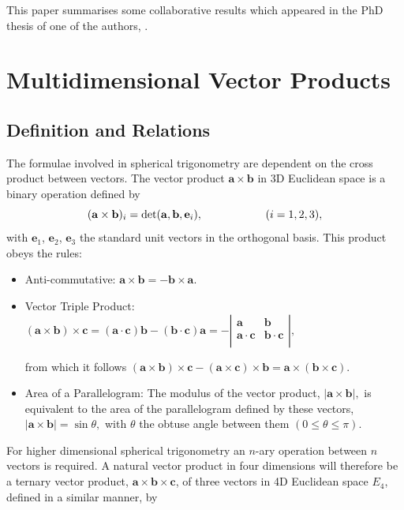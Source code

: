 \documentclass[fleqn,11pt,twoside]{article}
\theoremstyle{definition}
\begin{document}
 This paper summarises some collaborative results which 
appeared in the PhD thesis of one of the authors, \cite{Jennings-thesis}. 


\section{Multidimensional Vector Products}
\label{sec:multidim products}

\subsection{Definition and Relations}
The formulae involved in spherical trigonometry are dependent on the cross product between vectors. The vector product $\mathbf{a}\times\mathbf{b}$ in 3D Euclidean space is a binary operation defined by
\begin{equation}
(\mathbf{a}\times\mathbf{b})_i=\mathrm{det}(\mathbf{a},\mathbf{b},\mathbf{e}_i),\hspace{20mm}(i=1,2,3),
\end{equation}
with  $\mathbf{e}_1$, $\mathbf{e}_2$, $\mathbf{e}_3$ the standard unit vectors in the orthogonal basis. This product obeys the rules:
\begin{itemize}
	\item Anti-commutative: $\mathbf{a}\times\mathbf{b}=-\mathbf{b}\times\mathbf{a}.$
	\item Vector Triple Product: $(\mathbf{a}\times\mathbf{b})\times\mathbf{c}=(\mathbf{a}\cdot\mathbf{c})\mathbf{b}-(\mathbf{b}\cdot\mathbf{c})\mathbf{a}=-\left|
	\begin{array}{cc}
	\mathbf{a} & \mathbf{b} \\
	\mathbf{a}\cdot\mathbf{c} & \mathbf{b}\cdot\mathbf{c}\\	
	\end{array}\right|,$
	
	from which it follows
	$(\mathbf{a}\times\mathbf{b})\times\mathbf{c}-(\mathbf{a}\times\mathbf{c})\times\mathbf{b}=\mathbf{a}\times(\mathbf{b}\times\mathbf{c}).$
	\item Area of a Parallelogram: The modulus of the vector product, $|\mathbf{a}\times\mathbf{b}|,$ is equivalent to the area of the parallelogram defined by these vectors, $|\mathbf{a}\times\mathbf{b}|=\sin\theta,$ with $\theta$ the obtuse angle between them $(0\leq\theta\leq\pi).$
\end{itemize}
For higher dimensional spherical trigonometry an $n$-ary operation between $n$ vectors is required. A natural vector product in four dimensions will therefore be a ternary vector product, $\mathbf{a}\times\mathbf{b}\times\mathbf{c}$, of three vectors in 4D Euclidean space $E_4$, defined in a similar manner, by
\end{document}

